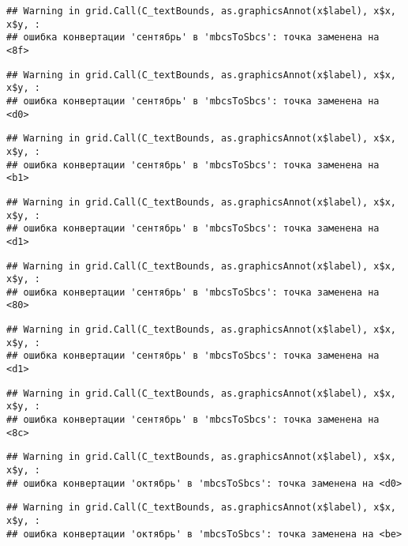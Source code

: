 \documentclass[
]{article}
\begin{document}
\begin{verbatim}
## Warning in grid.Call(C_textBounds, as.graphicsAnnot(x$label), x$x, x$y, :
## ошибка конвертации 'сентябрь' в 'mbcsToSbcs': точка заменена на <8f>
\end{verbatim}

\begin{verbatim}
## Warning in grid.Call(C_textBounds, as.graphicsAnnot(x$label), x$x, x$y, :
## ошибка конвертации 'сентябрь' в 'mbcsToSbcs': точка заменена на <d0>
\end{verbatim}

\begin{verbatim}
## Warning in grid.Call(C_textBounds, as.graphicsAnnot(x$label), x$x, x$y, :
## ошибка конвертации 'сентябрь' в 'mbcsToSbcs': точка заменена на <b1>
\end{verbatim}

\begin{verbatim}
## Warning in grid.Call(C_textBounds, as.graphicsAnnot(x$label), x$x, x$y, :
## ошибка конвертации 'сентябрь' в 'mbcsToSbcs': точка заменена на <d1>
\end{verbatim}

\begin{verbatim}
## Warning in grid.Call(C_textBounds, as.graphicsAnnot(x$label), x$x, x$y, :
## ошибка конвертации 'сентябрь' в 'mbcsToSbcs': точка заменена на <80>
\end{verbatim}

\begin{verbatim}
## Warning in grid.Call(C_textBounds, as.graphicsAnnot(x$label), x$x, x$y, :
## ошибка конвертации 'сентябрь' в 'mbcsToSbcs': точка заменена на <d1>
\end{verbatim}

\begin{verbatim}
## Warning in grid.Call(C_textBounds, as.graphicsAnnot(x$label), x$x, x$y, :
## ошибка конвертации 'сентябрь' в 'mbcsToSbcs': точка заменена на <8c>
\end{verbatim}

\begin{verbatim}
## Warning in grid.Call(C_textBounds, as.graphicsAnnot(x$label), x$x, x$y, :
## ошибка конвертации 'октябрь' в 'mbcsToSbcs': точка заменена на <d0>
\end{verbatim}

\begin{verbatim}
## Warning in grid.Call(C_textBounds, as.graphicsAnnot(x$label), x$x, x$y, :
## ошибка конвертации 'октябрь' в 'mbcsToSbcs': точка заменена на <be>
\end{verbatim}
\end{document}
